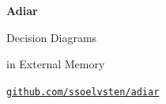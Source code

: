 \documentclass[english, aspectratio=169]{beamer}
\begin{document}
\begin{frame}{}
  \begin{center}
    {\Huge \textbf{Adiar}}

    {\Large
      Decision Diagrams

      \vspace{-5pt}
      in External Memory
    }

    \vspace{12pt}

    \textcolor{gray}{
      \href{http://github.com/ssoelvsten/adiar}{\texttt{github.com/ssoelvsten/adiar}}
    }

    \vspace{80pt}
  \end{center}
\end{frame}

\end{document}

